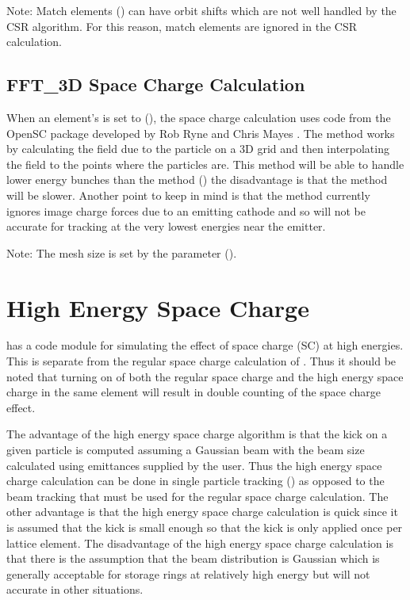 Note: Match elements () can have orbit shifts which are not well handled by the CSR
algorithm. For this reason, match elements are ignored in the CSR calculation.

\subsection{FFT_3D Space Charge Calculation}
\label{s:sc.fft}

When an element's  is set to  (), the space
charge calculation uses code from the OpenSC package developed by Rob Ryne and Chris Mayes
\cite{b:opensc}. The method works by calculating the field due to the particle on a 3D grid and then
interpolating the field to the points where the particles are. This method will be able to handle
lower energy bunches than the  method () the disadvantage is that the
 method will be slower. Another point to keep in mind is that the  method
currently ignores image charge forces due to an emitting cathode and so will not be accurate for
tracking at the very lowest energies near the emitter.

Note: The mesh size is set by the  parameter 
().

\section{High Energy Space Charge}
\label{s:he.space.charge}

\bmad has a code module for simulating the effect of space charge (SC) at high energies. This is
separate from the regular space charge calculation of . Thus it should be noted that
turning on of both the regular space charge and the high energy space charge in the same element
will result in double counting of the space charge effect.

The advantage of the high energy space charge algorithm is that the kick on a given particle is
computed assuming a Gaussian beam with the beam size calculated using emittances supplied by the
user. Thus the high energy space charge calculation can be done in single particle tracking
() as opposed to the beam tracking that must be used for the regular space charge
calculation. The other advantage is that the high energy space charge calculation is quick since it
is assumed that the kick is small enough so that the kick is only applied once per lattice
element. The disadvantage of the high energy space charge calculation is that there is the
assumption that the beam distribution is Gaussian which is generally acceptable for storage rings at
relatively high energy but will not accurate in other situations.

